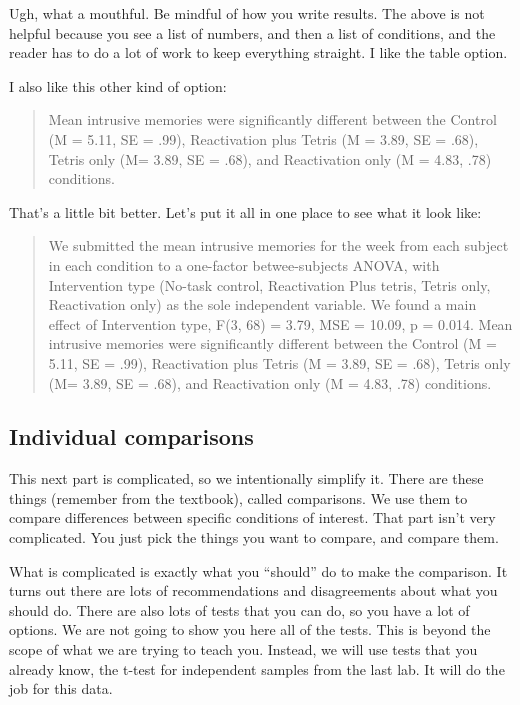 \documentclass[
]{book}
\begin{document}
Ugh, what a mouthful. Be mindful of how you write results. The above is not helpful because you see a list of numbers, and then a list of conditions, and the reader has to do a lot of work to keep everything straight. I like the table option.

I also like this other kind of option:

\begin{quote}
Mean intrusive memories were significantly different between the Control (M = 5.11, SE = .99), Reactivation plus Tetris (M = 3.89, SE = .68), Tetris only (M= 3.89, SE = .68), and Reactivation only (M = 4.83, .78) conditions.
\end{quote}

That's a little bit better. Let's put it all in one place to see what it look like:

\begin{quote}
We submitted the mean intrusive memories for the week from each subject in each condition to a one-factor betwee-subjects ANOVA, with Intervention type (No-task control, Reactivation Plus tetris, Tetris only, Reactivation only) as the sole independent variable. We found a main effect of Intervention type, F(3, 68) = 3.79, MSE = 10.09, p = 0.014. Mean intrusive memories were significantly different between the Control (M = 5.11, SE = .99), Reactivation plus Tetris (M = 3.89, SE = .68), Tetris only (M= 3.89, SE = .68), and Reactivation only (M = 4.83, .78) conditions.
\end{quote}

\hypertarget{individual-comparisons}{%
\subsection{Individual comparisons}\label{individual-comparisons}}

This next part is complicated, so we intentionally simplify it. There are these things (remember from the textbook), called comparisons. We use them to compare differences between specific conditions of interest. That part isn't very complicated. You just pick the things you want to compare, and compare them.

What is complicated is exactly what you ``should'' do to make the comparison. It turns out there are lots of recommendations and disagreements about what you should do. There are also lots of tests that you can do, so you have a lot of options. We are not going to show you here all of the tests. This is beyond the scope of what we are trying to teach you. Instead, we will use tests that you already know, the t-test for independent samples from the last lab. It will do the job for this data.
\end{document}
